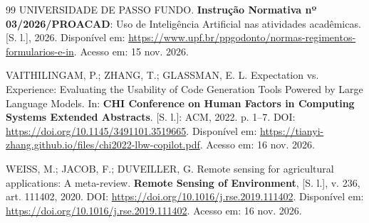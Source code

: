 \begin{thebibliography}{99}
\MakeUppercase{{Universidade de Passo Fundo}}.
\textbf{Instrução Normativa nº 03/2026/PROACAD}: Uso de Inteligência Artificial nas atividades acadêmicas.
[S. l.], 2026.
Disponível em: \url{https://www.upf.br/ppgodonto/normas-regimentos-formularios-e-in}.
Acesso em: 15 nov. 2026.

\MakeUppercase{Vaithilingam}, P.; \MakeUppercase{Zhang}, T.; \MakeUppercase{Glassman}, E. L.
Expectation vs. Experience: Evaluating the Usability of Code Generation Tools Powered by Large Language Models.
In:
\textbf{CHI Conference on Human Factors in Computing Systems Extended Abstracts}.
[S. l.]: ACM, 2022.
p. 1--7.
DOI: \url{https://doi.org/10.1145/3491101.3519665}.
Disponível em: \url{https://tianyi-zhang.github.io/files/chi2022-lbw-copilot.pdf}.
Acesso em: 16 nov. 2026.

\MakeUppercase{Weiss}, M.; \MakeUppercase{Jacob}, F.; \MakeUppercase{Duveiller}, G.
Remote sensing for agricultural applications: A meta-review.
\textbf{Remote Sensing of Environment}, [S. l.],
v. 236,
art. 111402,
2020.
DOI: \url{https://doi.org/10.1016/j.rse.2019.111402}.
Disponível em: \url{https://doi.org/10.1016/j.rse.2019.111402}.
Acesso em: 16 nov. 2026.

\end{thebibliography}
